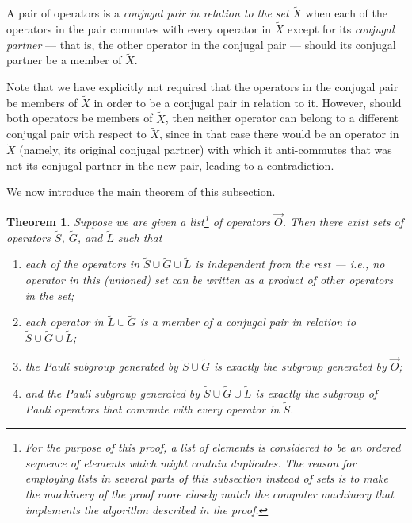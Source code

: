 \documentclass[twocolumn,showpacs,preprintnumbers,amsmath,amssymb,nofootinbib,pra,floatfix]{revtex4}
\newtheorem{theorem}{Theorem}
\newenvironment{definition}[1][Definition]{\begin{trivlist}
\item[\hskip \labelsep {\bfseries #1}]}{\end{trivlist}}
\newcommand{\lst}{\vec}
\newcommand{\set}{\tilde}
\begin{document}
\begin{definition} A pair of operators is a \emph{conjugal pair in relation to the set} $\set X$ when each of the operators in the pair commutes with every operator in $\set X$ except for its \emph{conjugal partner} --- that is, the other operator in the conjugal pair --- should its conjugal partner be a member of $\set X$.
\end{definition}

Note that we have explicitly not required that the operators in the conjugal pair be members of $\set X$ in order to be a conjugal pair in relation to it.  However, should both operators be members of $\set X$, then neither operator can belong to a different conjugal pair with respect to $\set X$, since in that case there would be an operator in $\set X$ (namely, its original conjugal partner) with which it anti-commutes that was not its conjugal partner in the new pair, leading to a contradiction.

We now introduce the main theorem of this subsection.

\begin{theorem} \label{theorem-SG} Suppose we are given a list\footnote{For the purpose of this proof, a list of elements is considered to be an ordered sequence of elements which might contain duplicates.  The reason for employing lists in several parts of this subsection instead of sets is to make the machinery of the proof more closely match the computer machinery that implements the algorithm described in the proof.}
 of operators $\lst O$.  Then there exist sets of operators $\set S$, $\set G$, and $\set L$ such that
\begin{enumerate}
\item each of the operators in $\set S \cup \set G \cup \set L$ is independent from the rest --- i.e., no operator in this (unioned) set can be written as a product of other operators in the set;
\item each operator in $\set L \cup \set G$ is a member of a conjugal pair in relation to $\set S \cup \set G \cup \set L$;
\item the Pauli subgroup generated by $\set S \cup \set G$ is exactly the subgroup generated by $\lst O$;
\item and the Pauli subgroup generated by $\set S \cup \set G \cup \set L$ is exactly the subgroup of Pauli operators that commute with every operator in $\set S$.
\end{enumerate}
\end{theorem}
\end{document}
